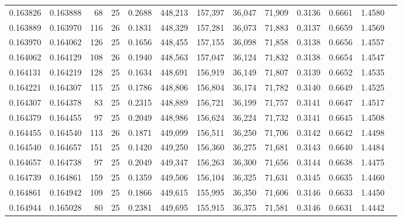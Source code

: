 \begin{tabular}{rrrrrrrrrrrrr}
0.163826 & 0.163888 &    68 &  25 &                                     0.2688 & 448,213 & 157,397 &  36,047 &  71,909 & 0.3136 & 0.6661 & 1.4580 \\
0.163889 & 0.163970 &   116 &  26 &                                     0.1831 & 448,329 & 157,281 &  36,073 &  71,883 & 0.3137 & 0.6659 & 1.4569 \\
0.163970 & 0.164062 &   126 &  25 &                                     0.1656 & 448,455 & 157,155 &  36,098 &  71,858 & 0.3138 & 0.6656 & 1.4557 \\
0.164062 & 0.164129 &   108 &  26 &                                     0.1940 & 448,563 & 157,047 &  36,124 &  71,832 & 0.3138 & 0.6654 & 1.4547 \\
0.164131 & 0.164219 &   128 &  25 &                                     0.1634 & 448,691 & 156,919 &  36,149 &  71,807 & 0.3139 & 0.6652 & 1.4535 \\
0.164221 & 0.164307 &   115 &  25 &                                     0.1786 & 448,806 & 156,804 &  36,174 &  71,782 & 0.3140 & 0.6649 & 1.4525 \\
0.164307 & 0.164378 &    83 &  25 &                                     0.2315 & 448,889 & 156,721 &  36,199 &  71,757 & 0.3141 & 0.6647 & 1.4517 \\
0.164379 & 0.164455 &    97 &  25 &                                     0.2049 & 448,986 & 156,624 &  36,224 &  71,732 & 0.3141 & 0.6645 & 1.4508 \\
0.164455 & 0.164540 &   113 &  26 &                                     0.1871 & 449,099 & 156,511 &  36,250 &  71,706 & 0.3142 & 0.6642 & 1.4498 \\
0.164540 & 0.164657 &   151 &  25 &                                     0.1420 & 449,250 & 156,360 &  36,275 &  71,681 & 0.3143 & 0.6640 & 1.4484 \\
0.164657 & 0.164738 &    97 &  25 &                                     0.2049 & 449,347 & 156,263 &  36,300 &  71,656 & 0.3144 & 0.6638 & 1.4475 \\
0.164739 & 0.164861 &   159 &  25 &                                     0.1359 & 449,506 & 156,104 &  36,325 &  71,631 & 0.3145 & 0.6635 & 1.4460 \\
0.164861 & 0.164942 &   109 &  25 &                                     0.1866 & 449,615 & 155,995 &  36,350 &  71,606 & 0.3146 & 0.6633 & 1.4450 \\
0.164944 & 0.165028 &    80 &  25 &                                     0.2381 & 449,695 & 155,915 &  36,375 &  71,581 & 0.3146 & 0.6631 & 1.4442 \\

\end{tabular}
